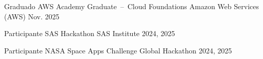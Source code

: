 

\begin{cvhonors}
  \cvhonor
    {Graduado} %
    {AWS Academy Graduate~--~Cloud Foundations} %
    {Amazon Web Services (AWS)} %
    {Nov. 2025} %

  \cvhonor
    {Participante}
    {SAS Hackathon}
    {SAS Institute}
    {2024, 2025}

  \cvhonor
    {Participante}
    {NASA Space Apps Challenge}
    {Global Hackathon}
    {2024, 2025}
\end{cvhonors}
